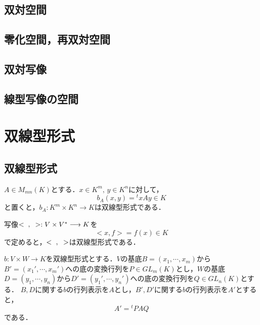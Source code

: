 \documentclass[uplatex, 12pt, dvipdfmx]{jsreport}
\begin{document}
\section{双対空間}

\section{零化空間，再双対空間}

\section{双対写像}

\section{線型写像の空間}

\chapter{双線型形式}

\section{双線型形式}

\begin{definition}[行列Aが定める双線型形式]
    $A\in M_{mn}(K)$とする．$x\in K^m,\,y\in K^n$に対して，$$b_A(x,y)={}^txAy\in K$$と置くと，$b_A:K^m\times K^n\longrightarrow K$は双線型形式である．
\end{definition}
\begin{definition}[標準双線型形式]
    写像$<\hspace{2mm},\hspace{2mm}>:V\times V^*\longrightarrow K$を$$<x,f>=f(x)\in K$$で定めると，$<\hspace{2mm},\hspace{2mm}>$は双線型形式である．
\end{definition}

\begin{proposition}
    $b:V\times W\longrightarrow K$を双線型形式とする．$V$の基底$B=(x_1,\cdots,x_m)$から$B'=(x_1',\cdots,x_m')$への底の変換行列を$P\in GL_m(K)$とし，$W$の基底$D=(y_1,\cdots,y_n)$から$D'=(y_1',\cdots,y_n')$への底の変換行列を$Q\in GL_n(K)$とする．
    $B,D$に関する$b$の行列表示を$A$とし，$B',D'$に関する$b$の行列表示を$A'$とすると，$$A'={}^tPAQ$$である．
\end{proposition}
\end{document}
